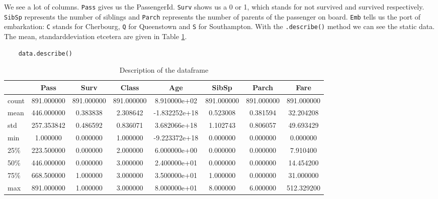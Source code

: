 \documentclass[11pt]{article}
\begin{document}
We see a lot of columns. \texttt{Pass} gives us the PassengerId. \texttt{Surv} shows us a 0 or 1, which stands for not survived and survived respectively. \texttt{SibSp} represents the number of siblings and \texttt{Parch} represents the number of parents of the passenger on board. \texttt{Emb} tells us the port of embarkation: \texttt{C} stands for Cherbourg, \texttt{Q} for Queenstown and \texttt{S} for Southampton. With the \texttt{.describe()} method we can see the static data. The mean, standarddeviation etcetera are given in Table \ref{tab:table2}.

\begin{verbatim}
    data.describe()
\end{verbatim}

\begin{table}
\small
\begin{center}
\caption{\label{tab:table2}Description of the dataframe}
\begin{tabular}{|l|c|c|c|c|c|c|c|}
\toprule
\hline
{} &  Pass &    Surv &      Class &           Age &       SibSp &       Parch &        Fare \\
\midrule
\hline
count &   891.000000 &  891.000000 &  891.000000 &  8.910000e+02 &  891.000000 &  891.000000 &  891.000000 \\
mean  &   446.000000 &    0.383838 &    2.308642 & -1.832252e+18 &    0.523008 &    0.381594 &   32.204208 \\
std   &   257.353842 &    0.486592 &    0.836071 &  3.682066e+18 &    1.102743 &    0.806057 &   49.693429 \\
min   &     1.000000 &    0.000000 &    1.000000 & -9.223372e+18 &    0.000000 &    0.000000 &    0.000000 \\
25\%   &   223.500000 &    0.000000 &    2.000000 &  6.000000e+00 &    0.000000 &    0.000000 &    7.910400 \\
50\%   &   446.000000 &    0.000000 &    3.000000 &  2.400000e+01 &    0.000000 &    0.000000 &   14.454200 \\
75\%   &   668.500000 &    1.000000 &    3.000000 &  3.500000e+01 &    1.000000 &    0.000000 &   31.000000 \\
max   &   891.000000 &    1.000000 &    3.000000 &  8.000000e+01 &    8.000000 &    6.000000 &  512.329200 \\
\bottomrule
\hline
\end{tabular}
\end{center}
\end{table}
\end{document}
